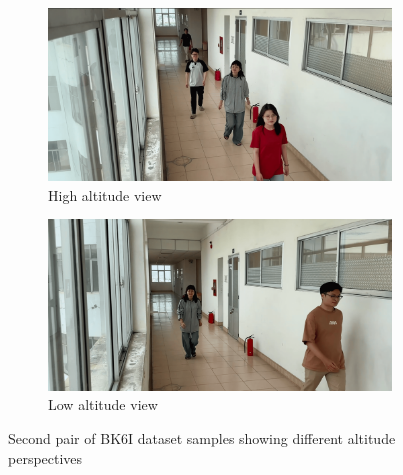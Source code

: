 \begin{figure}[htbp]
    \centering
    \begin{subfigure}[b]{0.48\textwidth}
        \centering
        \includegraphics[width=\textwidth]{Figure/edtech_high_2.png}
        \caption{High altitude view}
        \label{fig:edtech_high2}
    \end{subfigure}
    \hfill
    \begin{subfigure}[b]{0.48\textwidth}
        \centering
        \includegraphics[width=\textwidth]{Figure/edtech_low_2.png}
        \caption{Low altitude view}
        \label{fig:edtech_low2}
    \end{subfigure}
    \caption{Second pair of BK6I dataset samples showing different altitude perspectives}
    \label{fig:bk6i_pair2}
\end{figure}

